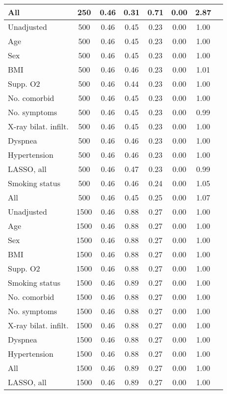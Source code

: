 \documentclass{article}
\begin{document}
{\begin{longtable}{lccccccc}
All & 250 & 0.46 & 0.31 & 0.71 & 0.00 & 2.87 \\ \midrule 
Unadjusted & 500 & 0.46 & 0.45 & 0.23 & 0.00 & 1.00 \\ 
Age & 500 & 0.46 & 0.45 & 0.23 & 0.00 & 1.00 \\ 
Sex & 500 & 0.46 & 0.45 & 0.23 & 0.00 & 1.00 \\ 
BMI & 500 & 0.46 & 0.46 & 0.23 & 0.00 & 1.01 \\ 
Supp. O2 & 500 & 0.46 & 0.44 & 0.23 & 0.00 & 1.00 \\ 
No. comorbid & 500 & 0.46 & 0.45 & 0.23 & 0.00 & 1.00 \\ 
No. symptoms & 500 & 0.46 & 0.45 & 0.23 & 0.00 & 0.99 \\ 
X-ray bilat. infilt. & 500 & 0.46 & 0.45 & 0.23 & 0.00 & 1.00 \\ 
Dyspnea & 500 & 0.46 & 0.46 & 0.23 & 0.00 & 1.00 \\ 
Hypertension & 500 & 0.46 & 0.46 & 0.23 & 0.00 & 1.00 \\ 
LASSO, all & 500 & 0.46 & 0.47 & 0.23 & 0.00 & 0.99 \\ 
Smoking status & 500 & 0.46 & 0.46 & 0.24 & 0.00 & 1.05 \\ 
All & 500 & 0.46 & 0.45 & 0.25 & 0.00 & 1.07 \\ \midrule 
Unadjusted & 1500 & 0.46 & 0.88 & 0.27 & 0.00 & 1.00 \\ 
Age & 1500 & 0.46 & 0.88 & 0.27 & 0.00 & 1.00 \\ 
Sex & 1500 & 0.46 & 0.88 & 0.27 & 0.00 & 1.00 \\ 
BMI & 1500 & 0.46 & 0.88 & 0.27 & 0.00 & 1.00 \\ 
Supp. O2 & 1500 & 0.46 & 0.88 & 0.27 & 0.00 & 1.00 \\ 
Smoking status & 1500 & 0.46 & 0.89 & 0.27 & 0.00 & 1.00 \\ 
No. comorbid & 1500 & 0.46 & 0.88 & 0.27 & 0.00 & 1.00 \\ 
No. symptoms & 1500 & 0.46 & 0.88 & 0.27 & 0.00 & 1.00 \\ 
X-ray bilat. infilt. & 1500 & 0.46 & 0.88 & 0.27 & 0.00 & 1.00 \\ 
Dyspnea & 1500 & 0.46 & 0.88 & 0.27 & 0.00 & 1.00 \\ 
Hypertension & 1500 & 0.46 & 0.88 & 0.27 & 0.00 & 1.00 \\ 
All & 1500 & 0.46 & 0.89 & 0.27 & 0.00 & 1.00 \\ 
LASSO, all & 1500 & 0.46 & 0.89 & 0.27 & 0.00 & 1.00 \\
\bottomrule
\hline
\end{longtable}
}
\end{document}
